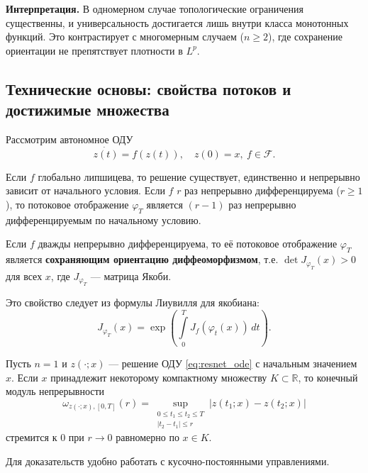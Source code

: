 \documentclass[../NDCNNAI_main.tex]{subfiles}
\begin{document}
\textbf{Интерпретация.} В одномерном случае топологические ограничения существенны, и универсальность достигается лишь внутри класса монотонных функций. Это контрастирует с многомерным случаем ($n \geq 2$), где сохранение ориентации не препятствует плотности в $L^p$.

\subsection{Технические основы: свойства потоков и достижимые множества}
Рассмотрим автономное ОДУ 
\[\dot{z(t)} = f(z(t)), \quad z(0)=x,~ f \in \mathcal{F}.\]

\begin{proposition}
\label{prop:ode_basic}
Если $f$ глобально липшицева, то решение существует, единственно и непрерывно зависит от начального условия. Если $f$ $r$ раз непрерывно дифференцируема ($r \geq 1$), то потоковое отображение $\varphi_T$ является $(r-1)$ раз непрерывно дифференцируемым по начальному условию.
\end{proposition}

\begin{proposition}
\label{prop:op_diffeomorphism}
Если $f$ дважды непрерывно дифференцируема, то её потоковое отображение $\varphi_T$ является \textbf{сохраняющим ориентацию диффеоморфизмом}, т.е. $\det J_{\varphi_T}(x) > 0$ для всех $x$, где $J_{\varphi_T}$ --- матрица Якоби.
\end{proposition}
Это свойство следует из формулы Лиувилля для якобиана: 
\[J_{\varphi_T}(x) = \exp\left( \int\limits_0^T J_f(\varphi_t(x)) \, dt \right).\]

\begin{proposition}\label{3.6}
Пусть \(n=1\) и \(z(\cdot;x)\) --- решение ОДУ \ref{eq:resnet_ode} с начальным значением \(x\). 
Если \(x\) принадлежит некоторому компактному множеству \(K \subset \mathbb{R}\), 
то конечный модуль непрерывности
\[
\omega_{z(\cdot;x), [0,T]}(r) = 
\sup_{\substack{0 \leq t_1 \leq t_2 \leq T \\ |t_2 - t_1| \leq r}} 
|z(t_1;x) - z(t_2;x)|
\]
стремится к \(0\) при \(r \to 0\) равномерно по \(x \in K\).
\end{proposition}

Для доказательств удобно работать с кусочно-постоянными управлениями.
\end{document}
